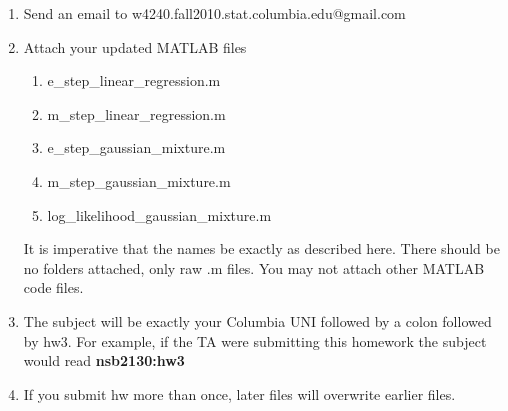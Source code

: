 \documentclass[12pt]{article}
\begin{document}
\begin{enumerate}
	\item Send an email to w4240.fall2010.stat.columbia.edu@gmail.com
	\item {Attach your updated MATLAB files 
		\begin{enumerate}
			\item e\_step\_linear\_regression.m
			\item m\_step\_linear\_regression.m
			\item e\_step\_gaussian\_mixture.m
			\item m\_step\_gaussian\_mixture.m
			\item  log\_likelihood\_gaussian\_mixture.m
		\end{enumerate} It is imperative that the names be exactly as described here. There should be no folders attached, only raw .m files.  You may not attach other MATLAB code files. }
	\item The subject will be exactly your Columbia UNI followed by a colon followed by hw3.  For example, if the TA were submitting this homework the subject would read {\bf nsb2130:hw3}
	\item If you submit hw more than once, later files will overwrite earlier files.
\end{enumerate}


\problemsdone
\end{document}
